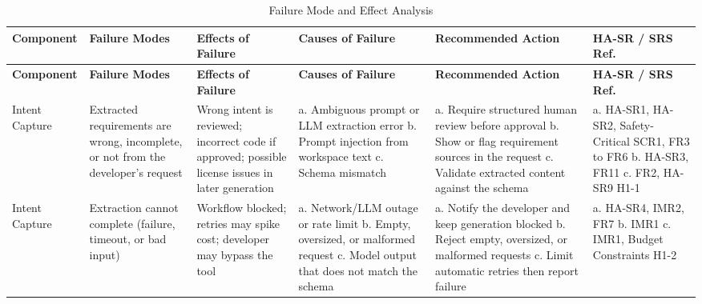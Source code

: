 \documentclass{article}
\begin{document}
\begin{landscape}
\begin{small}
\begin{longtable}{|p{2.1cm}|p{2.4cm}|p{2.8cm}|p{3.2cm}|p{3.6cm}|p{2.4cm}|}
\caption{Failure Mode and Effect Analysis}
\label{TblFMEA}\\
\hline
\textbf{Component} & \textbf{Failure Modes} & \textbf{Effects of Failure} &
\textbf{Causes of Failure} & \textbf{Recommended Action} &
\textbf{HA-SR / SRS Ref.} \\
\hline
\endfirsthead
\hline
\textbf{Component} & \textbf{Failure Modes} & \textbf{Effects of Failure} &
\textbf{Causes of Failure} & \textbf{Recommended Action} &
\textbf{HA-SR / SRS Ref.} \\
\hline
\endhead
\hline
\endfoot

Intent Capture &
Extracted requirements are wrong, incomplete, or not from the developer's
request &
Wrong intent is reviewed; incorrect code if approved; possible license issues
in later generation &
a. Ambiguous prompt or LLM extraction error\newline
b. Prompt injection from workspace text\newline
c. Schema mismatch &
a. Require structured human review before approval\newline
b. Show or flag requirement sources in the request\newline
c. Validate extracted content against the schema &
a. HA-SR1, HA-SR2, Safety-Critical SCR1, FR3 to FR6\newline
b. HA-SR3, FR11\newline
c. FR2, HA-SR9\newline
H1-1 \\
\hline

Intent Capture &
Extraction cannot complete (failure, timeout, or bad input) &
Workflow blocked; retries may spike cost; developer may bypass the tool &
a. Network/LLM outage or rate limit\newline
b. Empty, oversized, or malformed request\newline
c. Model output that does not match the schema &
a. Notify the developer and keep generation blocked\newline
b. Reject empty, oversized, or malformed requests\newline
c. Limit automatic retries then report failure &
a. HA-SR4, IMR2, FR7\newline
b. IMR1\newline
c. IMR1, Budget Constraints\newline
H1-2 \\
\hline


\end{longtable}
\end{small}
\end{landscape}
\end{document}
